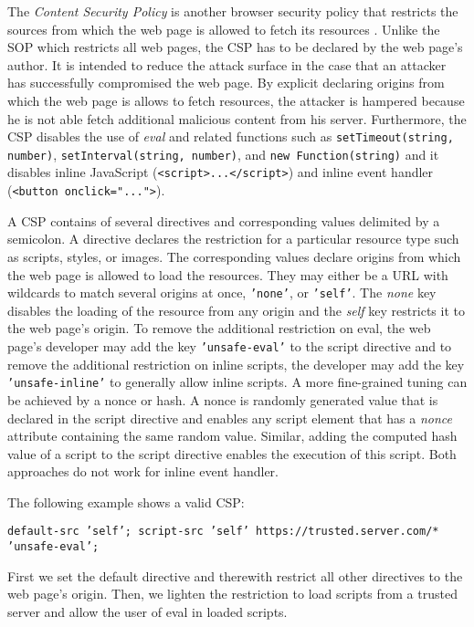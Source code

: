 	The \textit{Content Security Policy} is another browser security policy that restricts the sources from which the web page is allowed to fetch its resources \cite{w3cContentSecurityPolicySpecification}. Unlike the SOP which restricts all web pages, the CSP has to be declared by the web page's author. It is intended to reduce the attack surface in the case that an attacker has successfully compromised the web page. By explicit declaring origins from which the web page is allows to fetch resources, the attacker is hampered because he is not able fetch additional malicious content from his server. Furthermore, the CSP disables the use of \textit{eval} and related functions such as \texttt{setTimeout(string, number)}, \texttt{setInterval(string, number)}, and \texttt{new Function(string)} and it disables inline JavaScript (\texttt{<script>...</script>}) and inline event handler (\texttt{<button onclick="...">}).
	
	A CSP contains of several directives and corresponding values delimited by a semicolon. A directive declares the restriction for a particular resource type such as scripts, styles, or images. The corresponding values declare origins from which the web page is allowed to load the resources. They may either be a URL with wildcards to match several origins at once, \texttt{'none'}, or \texttt{'self'}. The \textit{none} key disables the loading of the resource from any origin and the \textit{self} key restricts it to the web page's origin. To remove the additional restriction on eval, the web page's developer may add the key \texttt{'unsafe-eval'} to the script directive and to remove the additional restriction on inline scripts, the developer may add the key \texttt{'unsafe-inline'} to generally allow inline scripts. A more fine-grained tuning can be achieved by a nonce or hash. A nonce is randomly generated value that is declared in the script directive and enables any script element that has a \textit{nonce} attribute containing the same random value. Similar, adding the computed hash value of a script to the script directive enables the execution of this script. Both approaches do not work for inline event handler.
	
	The following example shows a valid CSP:
	\begin{center}
		\texttt{default-src 'self'; script-src 'self' https://trusted.server.com/* 'unsafe-eval';}
	\end{center}
	First we set the default directive and therewith restrict all other directives to the web page's origin. Then, we lighten the restriction to load scripts from a trusted server and allow the user of eval in loaded scripts.

